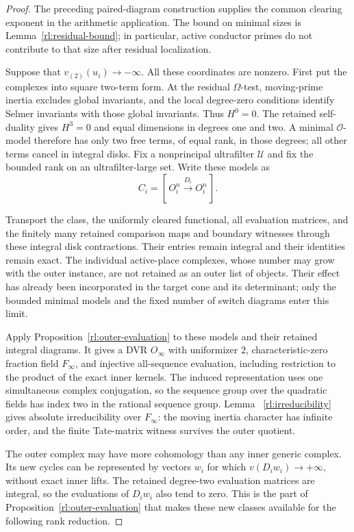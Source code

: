 \begin{proof}
The preceding paired-diagram construction supplies the common
clearing exponent in the arithmetic application.  The bound on
minimal sizes is Lemma~\ref{rl:residual-bound}; in particular,
active conductor primes do not contribute to that size after
residual localization.

Suppose that \(v_{(2)}(u_i)\to-\infty\).  All these coordinates
are nonzero.  First put the complexes into square two-term form.
At the residual \(\Omega\)-test, moving-prime inertia excludes
global invariants, and the local degree-zero conditions identify
Selmer invariants with those global invariants.  Thus \(H^0=0\).
The retained self-duality gives \(H^3=0\) and equal dimensions
in degrees one and two.  A minimal \(\mathcal O\)-model therefore
has only two free terms, of equal rank, in those degrees; all other
terms cancel in integral disks.  Fix a nonprincipal ultrafilter
\(\mathcal U\) and fix the bounded rank on an ultrafilter-large
set.  Write these models as
\[
 C_i=[\,O_i^n\xrightarrow{D_i}O_i^n\,].
\]

Transport the class, the uniformly cleared functional, all evaluation
matrices, and the finitely many retained comparison maps and boundary
witnesses through these integral disk contractions.  Their entries
remain integral and their identities remain exact.  The individual
active-place complexes, whose number may grow with the outer instance,
are not retained as an outer list of objects.  Their effect has already
been incorporated in the target cone and its determinant; only the
bounded minimal models and the fixed number of switch diagrams enter
this limit.

Apply Proposition~\ref{rl:outer-evaluation} to these models and
their retained integral diagrams.  It gives a DVR \(O_\infty\)
with uniformizer \(2\), characteristic-zero fraction field
\(F_\infty\), and injective all-sequence evaluation, including
restriction to the product of the exact inner kernels.
The induced representation uses one simultaneous complex
conjugation, so the sequence group over the quadratic fields has
index two in the rational sequence group.  Lemma~
\ref{rl:irreducibility} gives absolute irreducibility over
\(F_\infty\): the moving inertia character has infinite order,
and the finite Tate-matrix witness survives the outer quotient.

The outer complex may have more cohomology than any inner generic
complex.  Its new cycles can be represented by vectors \(w_i\)
for which \(v(D_iw_i)\to+\infty\), without exact inner lifts.
The retained degree-two evaluation matrices are integral, so the
evaluations of \(D_iw_i\) also tend to zero.  This is the part of
Proposition~\ref{rl:outer-evaluation} that makes these new classes
available for the following rank reduction.


\end{proof}
